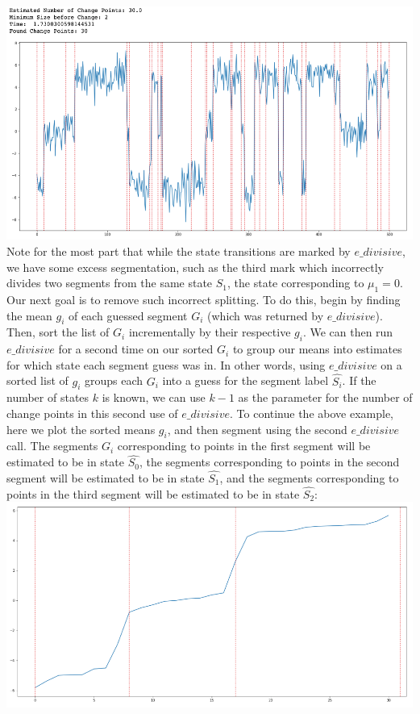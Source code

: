 \documentclass[a4paper]{amsproc}
\theoremstyle{plain}
\theoremstyle{definition}
\theoremstyle{remark}
\numberwithin{equation}{section}
\begin{document}
    \includegraphics[scale=0.4]{examplesplit.png}\\
    Note for the most part that while the state transitions are marked by $e\_divisive$, we have some excess segmentation, such as the third mark which incorrectly divides two segments from the same state $S_1$, the state corresponding to $\mu_1 = 0$. Our next goal is to remove such incorrect splitting. To do this, begin by finding the mean $g_i$ of each guessed segment $G_i$ (which was returned by $e\_divisive$). Then, sort the list of $G_i$ incrementally by their respective $g_i$. We can then run $e\_divisive$ for a second time on our sorted $G_i$ to group our means into estimates for which state each segment guess was in. In other words, using $e\_divisive$ on a sorted list of $g_i$ groups each $G_i$ into a guess for the segment label $\hat{S_i}$. If the number of states $k$ is known, we can use $k - 1$ as the parameter for the number of change points in this second use of $e\_divisive$. To continue the above example, here we plot the sorted means $g_i$, and then segment using the second $e\_divisive$ call. The segments $G_i$ corresponding to points in the first segment will be estimated to be in state $\hat{S_0}$, the segments corresponding to points in the second segment will be estimated to be in state $\hat{S_1}$, and the segments corresponding to points in the third segment will be estimated to be in state $\hat{S_2}$:\\
    \includegraphics[scale=0.4]{example2x.png}\\
\end{document}
